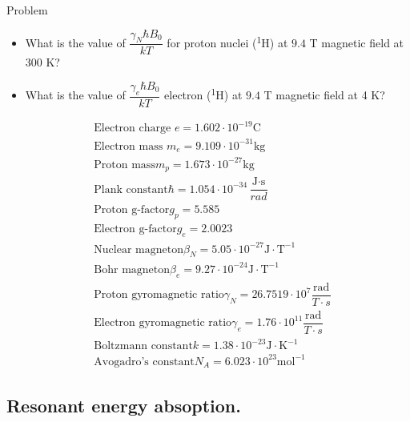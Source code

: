 \documentclass[handout]{beamer}
\begin{document}
\begin{frame}
	\begin{block}{Problem}
		\begin{itemize}
			\item What is the value of $\dfrac{\gamma_N \hbar B_0}{kT}$ for proton nuclei (\textsuperscript{1}H) at $9.4$ T magnetic field at 300 K?
			\item What is the value of $\dfrac{\gamma_e \hbar B_0}{kT}$ electron (\textsuperscript{1}H) at $9.4$ T magnetic field at 4 K?
		\end {itemize}      
	\end{block}
	{\tiny
	\begin{align*}
	&\text{Electron charge } e = 1.602 \cdot 10^{-19} \text{C}\\
	&\text{Electron mass } m_e = 9.109 \cdot 10^{-31} \text{kg} \\
	&\text{Proton mass}  m_p =  1.673 \cdot 10^{-27} \text{kg}  \\
	&\text{Plank constant}  \hbar =  1.054 \cdot 10^{-34} \dfrac{\text{J} \cdot \text{s}}{rad}  \\
	&\text{Proton g-factor}  g_p =  5.585 \\
	&\text{Electron g-factor}  g_e =  2.0023 \\
	&\text{Nuclear magneton}  \beta_N =  5.05 \cdot 10^{-27}  \text{J}\cdot \text{T}^{-1} \\
	&\text{Bohr magneton}  \beta_e =  9.27 \cdot 10^{-24}  \text{J}\cdot \text{T}^{-1} \\
	&\text{Proton gyromagnetic ratio}  \gamma_N =  26.7519 \cdot 10^{7} \dfrac{\text{rad}}{T \cdot s}\\
	&\text{Electron gyromagnetic ratio}  \gamma_e =  1.76 \cdot 10^{11} \dfrac{\text{rad}}{T \cdot s}\\
	&\text{Boltzmann constant}  k =  1.38 \cdot 10^{-23} {\text{J}} \cdot \text{K}^{-1}\\
	&\text{Avogadro's constant}  N_A =  6.023 \cdot 10^{23} \text{mol}^{-1}
	\end{align*}
    }%
\end{frame}
\subsection{Resonant energy absoption.}
\end{document}
